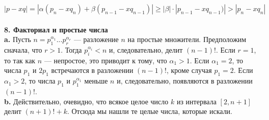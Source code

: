 \documentclass{mai_book}
\begin{document}
$$|p-xq|=|\alpha(p_n-xq_n)+\beta(p_{n-1}-xq_{n-1})|\geqslant|\beta|\cdot|p_{n-1}-xq_{n-1})|>|p_n-xq_n|$$
\\
\noindent\textbf{8. Факториал и простые числа} \newline 
\\
\hspace*{15pt}\textbf{a.} Пусть $n=p_1^{\alpha_1}...p_r^{\alpha_r}$  — разложение $n$ на простые множители. \linebreak
Предположим сначала, что $r>1$. Тогда $p_i^{\alpha_i}<n$ и, следовательно, делит\linebreak
$(n-1)!$. Если $r=1$, то так как $n$ — непростое, это приводит к тому,\linebreak
что $\alpha_1>1$. Если $\alpha_1=2$, то числа $p_1$ и $2p_1$ встречаются в разложении\linebreak
$(n-1)!$, кроме случая $p_1=2$. Если $\alpha_1>2$, то числа $p_1$ и $p_1^{\alpha_1}$ меньше $n$\linebreak
и, следовательно, появляются в разложении $(n-1)!$.\newline
\\
\hspace*{15pt}\textbf{b.} Действительно, очевидно, что всякое целое число $k$ из интервала\linebreak
$[2, n+1]$ делит $(n+1)!+k$. Отсюда мы нашли те целые числа, которые\linebreak
искали.\newpage
\end{document}
